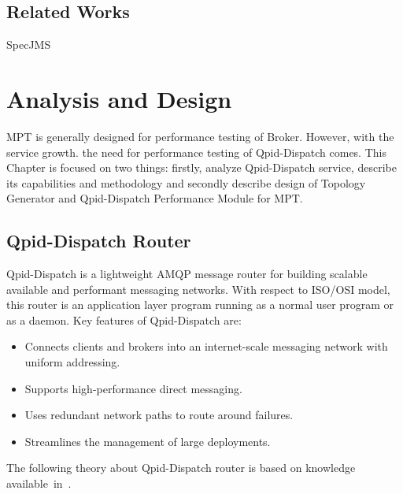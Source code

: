 \section{Related Works}
\label{Related Works}

SpecJMS

\chapter{Analysis and Design}
\label{Analysis and Design}
MPT is generally designed for performance testing of Broker. However, with the service growth. the need for performance testing of Qpid-Dispatch comes. This Chapter is focused on two things: firstly, analyze Qpid-Dispatch service, describe its capabilities and methodology and secondly describe design of Topology Generator and Qpid-Dispatch Performance Module for MPT.

\section{Qpid-Dispatch Router}
Qpid-Dispatch is a lightweight AMQP message router for building scalable available and performant messaging networks. With respect to ISO/OSI \footnotemark model, this router is an application layer program running as a normal user program or as a daemon. Key features of Qpid-Dispatch are:

\begin{itemize}
	\setlength\itemsep{0em}
	\item Connects clients and brokers into an internet-scale messaging network with uniform addressing.
	\item Supports high-performance direct messaging.
	\item Uses redundant network paths to route around failures.
	\item Streamlines the management of large deployments.
\end{itemize}
The following theory about Qpid-Dispatch router is based on knowledge available~in~\cite{RH:Interconnect}.


